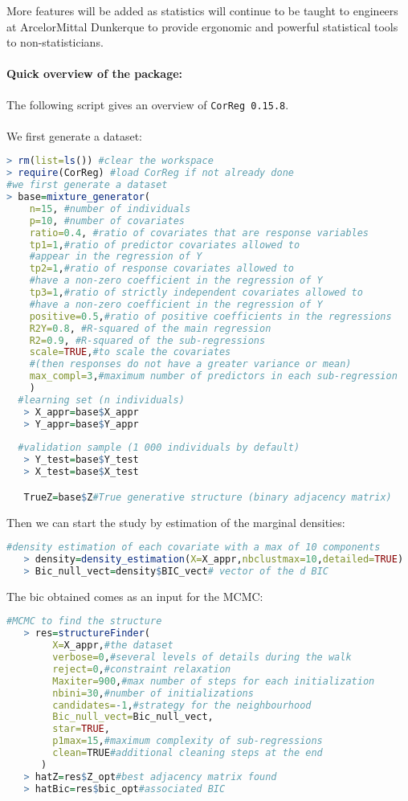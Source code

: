 \documentclass[12pt,a4paper]{report}
\begin{document}
\begin{appendices}
	More features will be added as statistics will continue to be taught to engineers at ArcelorMittal Dunkerque to provide ergonomic and powerful statistical tools to non-statisticians. \\
	\FloatBarrier	
\paragraph{Quick overview of the package:} The following script gives an overview of {\tt CorReg 0.15.8}. 
\\
\\
We first generate a dataset:
\begin{lstlisting}[language=R]
> rm(list=ls()) #clear the workspace
> require(CorReg) #load CorReg if not already done
#we first generate a dataset
> base=mixture_generator(
	n=15, #number of individuals
	p=10, #number of covariates
	ratio=0.4, #ratio of covariates that are response variables
	tp1=1,#ratio of predictor covariates allowed to 
	#appear in the regression of Y
	tp2=1,#ratio of response covariates allowed to 
	#have a non-zero coefficient in the regression of Y
	tp3=1,#ratio of strictly independent covariates allowed to 
	#have a non-zero coefficient in the regression of Y
	positive=0.5,#ratio of positive coefficients in the regressions
	R2Y=0.8, #R-squared of the main regression
	R2=0.9, #R-squared of the sub-regressions
	scale=TRUE,#to scale the covariates 
	#(then responses do not have a greater variance or mean)
	max_compl=3,#maximum number of predictors in each sub-regression
    )
  #learning set (n individuals)
   > X_appr=base$X_appr 
   > Y_appr=base$Y_appr 
   
  #validation sample (1 000 individuals by default)
   > Y_test=base$Y_test
   > X_test=base$X_test

   TrueZ=base$Z#True generative structure (binary adjacency matrix)
\end{lstlisting}
Then we can start the study by estimation of the marginal densities:
\begin{lstlisting}[language=R]
   #density estimation of each covariate with a max of 10 components
   > density=density_estimation(X=X_appr,nbclustmax=10,detailed=TRUE)
   > Bic_null_vect=density$BIC_vect# vector of the d BIC
\end{lstlisting}
The {\sc bic} obtained comes as an input for the MCMC:
\begin{lstlisting}[language=R]
   #MCMC to find the structure
   > res=structureFinder(
		X=X_appr,#the dataset
		verbose=0,#several levels of details during the walk
  		reject=0,#constraint relaxation
  		Maxiter=900,#max number of steps for each initialization
        nbini=30,#number of initializations
        candidates=-1,#strategy for the neighbourhood
        Bic_null_vect=Bic_null_vect,
        star=TRUE,
        p1max=15,#maximum complexity of sub-regressions
        clean=TRUE#additional cleaning steps at the end       
      )
   > hatZ=res$Z_opt#best adjacency matrix found
   > hatBic=res$bic_opt#associated BIC
\end{lstlisting}


\end{appendices}
\end{document}
